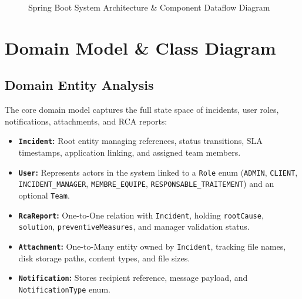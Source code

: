 \documentclass[12pt,a4paper]{report}
\begin{document}
\begin{figure}[htbp]
\caption{Spring Boot System Architecture \& Component Dataflow Diagram}
\label{fig:architecture}
\end{figure}

\chapter{Domain Model \& Class Diagram}

\section{Domain Entity Analysis}
The core domain model captures the full state space of incidents, user roles, notifications, attachments, and RCA reports:
\begin{itemize}
    \item \textbf{\texttt{Incident}:} Root entity managing references, status transitions, SLA timestamps, application linking, and assigned team members.
    \item \textbf{\texttt{User}:} Represents actors in the system linked to a \texttt{Role} enum (\texttt{ADMIN}, \texttt{CLIENT}, \texttt{INCIDENT\_MANAGER}, \texttt{MEMBRE\_EQUIPE}, \texttt{RESPONSABLE\_TRAITEMENT}) and an optional \texttt{Team}.
    \item \textbf{\texttt{RcaReport}:} One-to-One relation with \texttt{Incident}, holding \texttt{rootCause}, \texttt{solution}, \texttt{preventiveMeasures}, and manager validation status.
    \item \textbf{\texttt{Attachment}:} One-to-Many entity owned by \texttt{Incident}, tracking file names, disk storage paths, content types, and file sizes.
    \item \textbf{\texttt{Notification}:} Stores recipient reference, message payload, and \texttt{NotificationType} enum.
\end{itemize}
\end{document}
